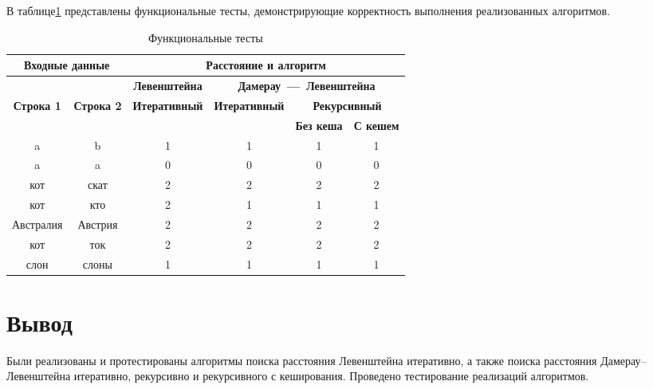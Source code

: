 В таблице\ref{tbl:func_tests} представлены функциональные тесты, демонстрирующие корректность выполнения реализованных алгоритмов.
\begin{table}[ht]
	\small
	\begin{center}
		\begin{threeparttable}
		\caption{Функциональные тесты}
		\label{tbl:func_tests}
		\begin{tabular}{|c|c|c|c|c|c|}
			\hline
			\multicolumn{2}{|c|}{\bfseries Входные данные}
			& \multicolumn{4}{c|}{\bfseries Расстояние и алгоритм} \\ 
			\hline 
			&
			& \multicolumn{1}{c|}{\bfseries Левенштейна} 
			& \multicolumn{3}{c|}{\bfseries Дамерау~---~Левенштейна} \\ \cline{3-6}
			
			\bfseries Строка 1 & \bfseries Строка 2 & \bfseries Итеративный & \bfseries Итеративный
			
			& \multicolumn{2}{c|}{\bfseries Рекурсивный} \\ \cline{5-6}
			& & & & \bfseries Без кеша & \bfseries С кешем \\
			\hline
			a & b & 1 & 1 & 1 & 1 \\
			\hline
			a & a & 0 & 0 & 0 & 0 \\
			\hline
			кот & скат & 2 & 2 & 2 & 2 \\
			\hline
			кот & кто & 2 & 1 & 1 & 1 \\
			\hline
			Австралия & Австрия & 2 & 2 & 2 & 2 \\
			\hline
			кот & ток & 2 & 2 & 2 & 2 \\
			\hline
			слон & слоны & 1 & 1 & 1 & 1 \\
			\hline
		\end{tabular}	
		\end{threeparttable}
	\end{center}
\end{table}

\section*{Вывод}
Были реализованы и протестированы алгоритмы поиска расстояния Левенштейна итеративно, а также поиска расстояния Дамерау–Левенштейна итеративно, рекурсивно и рекурсивного с кеширования. Проведено тестирование реализаций алгоритмов.
